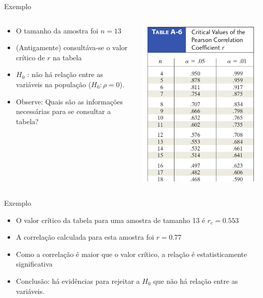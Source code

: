 \documentclass{beamer}
\begin{document}
\begin{frame}{Exemplo}
  \begin{columns}
    \begin{column}{5cm}
      \begin{itemize}
      \item O tamanho da amostra foi $n=13$
      \item (Antigamente) consultáva-se o valor crítico de $r$ na tabela
      \item $H_0$ : não há relação entre as variáveis na população ($H_0: \rho = 0$).
      \item Observe: Quais são as informações necessárias para se consultar a tabela?
      \end{itemize}
    \end{column}
    \begin{column}{5cm}
      \includegraphics[height=0.8\textheight]{Cap17/test}
    \end{column}
  \end{columns}
\end{frame}

\begin{frame}{Exemplo}
  \begin{itemize}
  \item O valor crítico da tabela para uma amostra de tamanho 13 é
    $r_c = 0.553$
  \item A correlação calculada para esta amostra foi $r=0.77$
  \item Como a correlação é maior que o valor crítico, a relação é
    estatisticamente significativa
  \item Conclusão: há evidências para rejeitar a $H_0$ que não há
    relação entre as variáveis.
  \end{itemize}
\end{frame}
\end{document}
